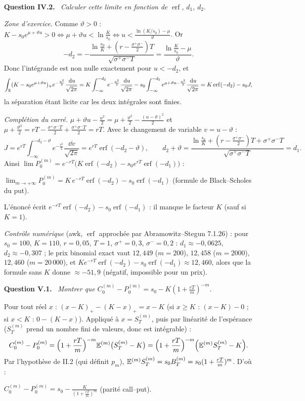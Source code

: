 \documentclass[11pt,a4paper]{article}
\newcommand{\question}[1]{\par\medskip\noindent\textbf{Question #1.}~}
\newcommand{\partie}[1]{\par\medskip\noindent{\bfseries Partie #1}\par\nopagebreak}
\DeclareMathOperator{\erf}{erf}
\newcommand{\Em}{\E^{(m)}}
\begin{document}
\begin{exo}
\question{IV.2} \emph{Calculer cette limite en fonction de $\erf$, $d_1$, $d_2$.}

\emph{Zone d'exercice.} Comme $\vartheta>0$ : $K-s_0e^{\mu+\vartheta u}>0\iff\mu+\vartheta u<\ln\frac K{s_0}\iff u<\frac{\ln(K/s_0)-\mu}\vartheta$. Or
\[-d_2=-\frac{\ln\frac{s_0}K+(r-\frac{\sigma^+\sigma^-}2)T}{\sqrt{\sigma^+\sigma^-T}}=\frac{\ln\frac K{s_0}-\mu}{\vartheta}.\]
Donc l'intégrande est non nulle exactement pour $u<-d_2$, et
\[\int_\R(K-s_0e^{\mu+\vartheta u})_+e^{-\frac{u^2}2}\frac{\dd u}{\sqrt{2\pi}}=K\int_{-\infty}^{-d_2}e^{-\frac{u^2}2}\frac{\dd u}{\sqrt{2\pi}}
-s_0\int_{-\infty}^{-d_2}e^{\mu+\vartheta u-\frac{u^2}2}\frac{\dd u}{\sqrt{2\pi}}=K\erf(-d_2)-s_0J ,\]
la séparation étant licite car les deux intégrales sont finies.

\emph{Complétion du carré.} $\mu+\vartheta u-\frac{u^2}2=\mu+\frac{\vartheta^2}2-\frac{(u-\vartheta)^2}2$ et
$\mu+\frac{\vartheta^2}2=rT-\frac{\sigma^+\sigma^-T}2+\frac{\sigma^+\sigma^-T}2=rT$. Avec le changement de variable $v=u-\vartheta$ :
\[J=e^{rT}\int_{-\infty}^{-d_2-\vartheta}e^{-\frac{v^2}2}\frac{\dd v}{\sqrt{2\pi}}=e^{rT}\erf(-d_2-\vartheta),\qquad
d_2+\vartheta=\frac{\ln\frac{s_0}K+(r-\frac{\sigma^+\sigma^-}2)T+\sigma^+\sigma^-T}{\sqrt{\sigma^+\sigma^-T}}=d_1 .\]
Ainsi $\lim P^{(m)}_0=e^{-rT}\bigl(K\erf(-d_2)-s_0e^{rT}\erf(-d_1)\bigr)$ :
\begin{resultat}
$\displaystyle\lim_{m\to+\infty}P^{(m)}_0=K\,e^{-rT}\erf(-d_2)-s_0\erf(-d_1)$ \quad(formule de Black--Scholes du put).

L'énoncé écrit $e^{-rT}\erf(-d_2)-s_0\erf(-d_1)$ : il manque le facteur $K$ (sauf si $K=1$).
\end{resultat}
\emph{Contrôle numérique} (awk, $\erf$ approchée par Abramowitz--Stegun 7.1.26) : pour $s_0=100$, $K=110$, $r=0{,}05$, $T=1$,
$\sigma^+=0{,}3$, $\sigma^-=0{,}2$ : $d_1\approx-0{,}0625$, $d_2\approx-0{,}307$ ; le prix binomial exact vaut $12{,}449$ ($m=200$),
$12{,}458$ ($m=2000$), $12{,}460$ ($m=20\,000$), et $Ke^{-rT}\erf(-d_2)-s_0\erf(-d_1)\approx12{,}460$, alors que la formule sans $K$
donne $\approx-51{,}9$ (négatif, impossible pour un prix).

\partie{V -- Call et parité call--put}

\question{V.1} \emph{Montrer que $C^{(m)}_0-P^{(m)}_0=s_0-K(1+\frac{rT}m)^{-m}$.}

Pour tout réel $x$ : $(x-K)_+-(K-x)_+=x-K$ (si $x\ge K$ : $(x-K)-0$ ; si $x<K$ : $0-(K-x)$). Appliqué à $x=S^{(m)}_T$, puis par linéarité
de l'espérance ($S^{(m)}_T$ prend un nombre fini de valeurs, donc est intégrable) :
\[C^{(m)}_0-P^{(m)}_0=\Bigl(1+\frac{rT}m\Bigr)^{-m}\Em\bigl(S^{(m)}_T-K\bigr)=\Bigl(1+\frac{rT}m\Bigr)^{-m}\Bigl(\Em S^{(m)}_T-K\Bigr).\]
Par l'hypothèse de II.2 (qui définit $p_m$), $\Em S^{(m)}_T=s_0B^{(m)}_T=s_0(1+\frac{rT}m)^m$. D'où :
\begin{resultat}
$\displaystyle C^{(m)}_0-P^{(m)}_0=s_0-\frac{K}{(1+\frac{rT}m)^m}$ (parité call--put).
\end{resultat}


\end{exo}
\end{document}
